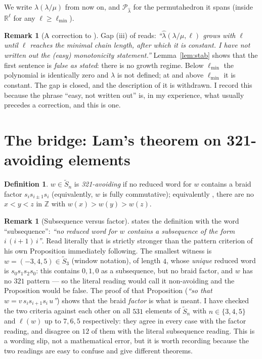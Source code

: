 \documentclass[11pt]{article}
\theoremstyle{plain}
\theoremstyle{definition}
\newtheorem{defn}[thm]{Definition}
\newtheorem{rem}[thm]{Remark}
\newcommand{\Z}{\mathbb{Z}}
\newcommand{\R}{\mathbb{R}}
\newcommand{\Saff}{\widetilde{S}_{n}}
\newcommand{\Perm}{\mathcal{P}}
\begin{document}
We write $\hat\lambda(\lambda/\mu)$ from now on, and $\Perm_{\hat\lambda}$ for the
permutahedron it spans (inside $\R^{\ell}$ for any $\ell\ge\ell_{\min}$).

\begin{rem}[A correction to \cite{Clio2026}]\label{rem:correction}
Gap (iii) of \cite[\S10]{Clio2026} reads: \emph{``$\hat\lambda(\lambda/\mu,\ell)$ grows with
$\ell$ until $\ell$ reaches the minimal chain length, after which it is constant. I have not
written out the (easy) monotonicity statement.''} Lemma~\ref{lem:stab} shows that the first
sentence is \emph{false as stated}: there is no growth regime. Below $\ell_{\min}$ the
polynomial is identically zero and $\hat\lambda$ is not defined; at and above $\ell_{\min}$ it
is constant. The gap is closed, and the description of it is withdrawn. I record this because
the phrase ``easy, not written out'' is, in my experience, what usually precedes a correction,
and this is one.
\end{rem}

\section{The bridge: Lam's theorem on 321-avoiding elements}\label{sec:bridge}

\begin{defn}
$w\in\Saff$ is \emph{321-avoiding} if no reduced word for $w$ contains a braid factor
$s_is_{i\pm1}s_i$ (equivalently, $w$ is fully commutative); equivalently
\cite[Prop.\ in \texttt{sec:321}]{Lam2006}, there are no $x<y<z$ in $\Z$ with
$w(x)>w(y)>w(z)$.
\end{defn}

\begin{rem}[Subsequence versus factor]\label{rem:subseq}
\cite[\texttt{sec:321}]{Lam2006} states the definition with the word ``subsequence'':
\emph{``no reduced word for $w$ contains a subsequence of the form $i\,(i+1)\,i$''}. Read
literally that is strictly stronger than the pattern criterion of his own Proposition
immediately following. The smallest witness is $w=(-3,4,5)\in\widetilde S_3$ (window
notation), of length $4$, whose \emph{unique} reduced word is $s_0s_1s_2s_0$: this contains
$0,1,0$ as a subsequence, but no braid factor, and $w$ has no $321$ pattern --- so the
literal reading would call it non-avoiding and the Proposition would be false. The proof of
that Proposition (\emph{``so that $w=v\,s_i s_{i+1} s_i\,u$''}) shows that the braid
\emph{factor} is what is meant. I have checked the two criteria against each other on all
$531$ elements of $\widetilde S_n$ with $n\in\{3,4,5\}$ and $\ell(w)$ up to $7,6,5$
respectively: they agree in every case with the factor reading, and disagree on $12$ of them
with the literal subsequence reading. This is a wording slip, not a mathematical error, but
it is worth recording because the two readings are easy to confuse and give different
theorems.
\end{rem}
\end{document}
